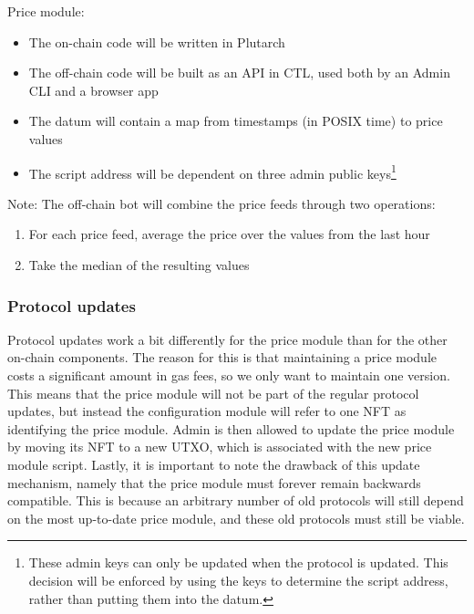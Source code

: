 \documentclass{article} %
\begin{document}
Price module:
\begin{itemize}
  \item The on-chain code will be written in Plutarch
  \item The off-chain code will be built as an API in CTL, used both by an Admin
    CLI and a browser app
  \item The datum will contain a map from timestamps (in POSIX time) to price
    values
  \item The script address will be dependent on three admin public
    keys\footnote{
      These admin keys can only be updated when the protocol is updated.
      This decision will be enforced by using the keys to determine the script
      address, rather than putting them into the datum.
    }
\end{itemize}

Note: The off-chain bot will combine the price feeds through two operations:
\begin{enumerate}
  \item For each price feed, average the price over the values from the last
    hour
  \item Take the median of the resulting values
\end{enumerate}

\subsubsection*{Protocol updates}

Protocol updates work a bit differently for the price module than for the other
on-chain components.
The reason for this is that maintaining a price module costs a significant
amount in gas fees, so we only want to maintain one version.
This means that the price module will not be part of the regular protocol
updates, but instead the configuration module will refer to one NFT as
identifying the price module.
Admin is then allowed to update the price module by moving its NFT to a new
UTXO, which is associated with the new price module script.
Lastly, it is important to note the drawback of this update mechanism, namely
that the price module must forever remain backwards compatible.
This is because an arbitrary number of old protocols will still depend on the
most up-to-date price module, and these old protocols must still be viable.
\end{document}
